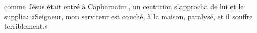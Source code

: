 \encetemps comme Jésus était entré à Capharnaüm,
	un centurion s’approcha de lui et le supplia:
	«Seigneur, mon serviteur est couché, à la maison, paralysé,
	et il souffre terriblement.»
